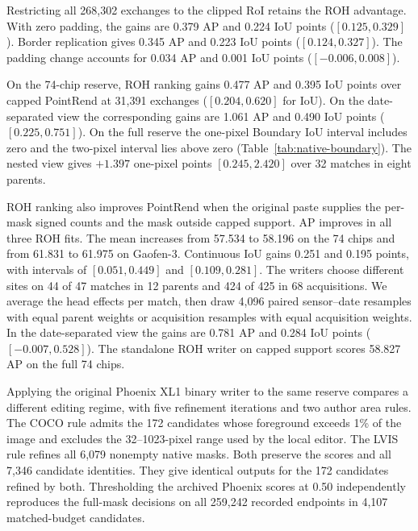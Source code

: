 \documentclass[journal]{IEEEtran}
\begin{document}
Restricting all 268,302 exchanges to the clipped RoI retains the ROH advantage. With zero padding, the gains are 0.379 AP and 0.224 IoU points (\([0.125,0.329]\)). Border replication gives 0.345 AP and 0.223 IoU points (\([0.124,0.327]\)). The padding change accounts for 0.034 AP and 0.001 IoU points (\([-0.006,0.008]\)).

On the 74-chip reserve, ROH ranking gains 0.477 AP and 0.395 IoU points over capped PointRend at 31,391 exchanges (\([0.204,0.620]\) for IoU). On the date-separated view the corresponding gains are 1.061 AP and 0.490 IoU points (\([0.225,0.751]\)). On the full reserve the one-pixel Boundary IoU interval includes zero and the two-pixel interval lies above zero (Table~\ref{tab:native-boundary}). The nested view gives \(+1.397\) one-pixel points \([0.245,2.420]\) over 32 matches in eight parents.

ROH ranking also improves PointRend when the original paste supplies the per-mask signed counts and the mask outside capped support. AP improves in all three ROH fits. The mean increases from 57.534 to 58.196 on the 74 chips and from 61.831 to 61.975 on Gaofen-3. Continuous IoU gains 0.251 and 0.195 points, with intervals of \([0.051,0.449]\) and \([0.109,0.281]\). The writers choose different sites on 44 of 47 matches in 12 parents and 424 of 425 in 68 acquisitions. We average the head effects per match, then draw 4,096 paired sensor--date resamples with equal parent weights or acquisition resamples with equal acquisition weights. In the date-separated view the gains are 0.781 AP and 0.284 IoU points (\([-0.007,0.528]\)). The standalone ROH writer on capped support scores 58.827 AP on the full 74 chips.

Applying the original Phoenix XL1 binary writer to the same reserve compares a different editing regime, with five refinement iterations and two author area rules. The COCO rule admits the 172 candidates whose foreground exceeds 1\% of the image and excludes the 32--1023-pixel range used by the local editor. The LVIS rule refines all 6,079 nonempty native masks. Both preserve the scores and all 7,346 candidate identities. They give identical outputs for the 172 candidates refined by both. Thresholding the archived Phoenix scores at 0.50 independently reproduces the full-mask decisions on all 259,242 recorded endpoints in 4,107 matched-budget candidates.
\end{document}

